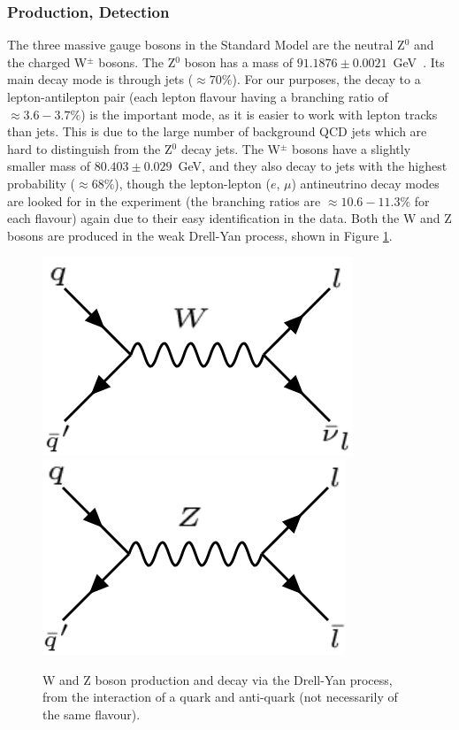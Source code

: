 \documentclass[twocolumn]{article}
\begin{document}
\subsubsection{Production, Detection}
The three massive gauge bosons in the Standard Model are the neutral Z$^0$ and the charged W$^\pm$ bosons. The Z$^0$ boson has a mass of $91.1876 \pm 0.0021$~GeV~\cite{manual}. Its main decay mode is through jets ($\approx 70\%$). For our purposes, the decay to a lepton-antilepton pair (each lepton flavour having a branching ratio of $\approx 3.6-3.7 \%$) is the important mode, as it is easier to work with lepton tracks than jets. This is due to the large number of background QCD jets which are hard to distinguish from the Z$^0$ decay jets. The W$^\pm$ bosons have a slightly smaller mass of $80.403 \pm 0.029$~GeV, and they also decay to jets with the highest probability ($\approx 68 \%$), though the lepton-lepton ($e$, $\mu$) antineutrino decay modes are looked for in the experiment (the branching ratios are $\approx 10.6-11.3\%$ for each flavour) again due to their easy identification in the data. Both the W and Z bosons are produced in the weak Drell-Yan process, shown in Figure \ref{fig:WDiagram}.
\begin{figure} [!h]
\includegraphics[scale=0.33]{Images/WDiagram.png}
\includegraphics[scale=0.33]{Images/ZDiagram_differentflavour.png}
\caption{W and Z boson production and decay via the Drell-Yan process, from the interaction of a quark and anti-quark (not necessarily of the same flavour).}
\label{fig:WDiagram}
\end{figure}
\end{document}
